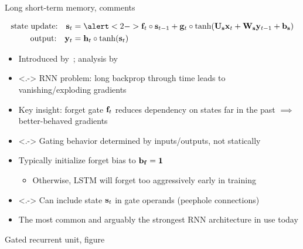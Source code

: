 \begin{frame}{Long short-term memory, comments}
    \begin{block}{}
        \vspace{-5mm}
        \begin{align*}
            \text{state update:} \quad \s_t &= \alert<2->{\f_t} \circ \s_{t-1} + \g_t \circ \tanh(\U_\s \x_t + \W_\s \y_{t-1} + \b_\s) \\
            \text{output:} \quad \y_t &= \h_t \circ \tanh(\s_t)
        \end{align*}
    \end{block}

    \begin{itemize}
        \item<+-> Introduced by~\citet{HochreiterNC97}; analysis by \citet{GreffIEEENNLS17}
        \item<.-> RNN problem: long backprop through time leads to vanishing/exploding gradients
        \item<+-> Key insight: \alert{forget gate $\mathbf{f}_t$} reduces dependency on states far in the past $\implies$ better-behaved gradients
        \item<.-> Gating behavior determined by inputs/outputs, not statically
        \item<+-> Typically initialize forget bias to $\mathbf{b}_{\mathbf{f}} = \mathbf{1}$~\citep{GersNC00,JozefowiczICML15}
        \begin{itemize}
            \item Otherwise, LSTM will forget too aggressively early in training
        \end{itemize}
        \item<.-> Can include state $\mathbf{s}_t$ in gate operands (peephole connections)
        \item<+-> The most common and arguably the strongest RNN architecture in use today \citep{JozefowiczICML15}
    \end{itemize}
\end{frame}

\begin{frame}{Gated recurrent unit, figure}
    \centering
    
\end{frame}


